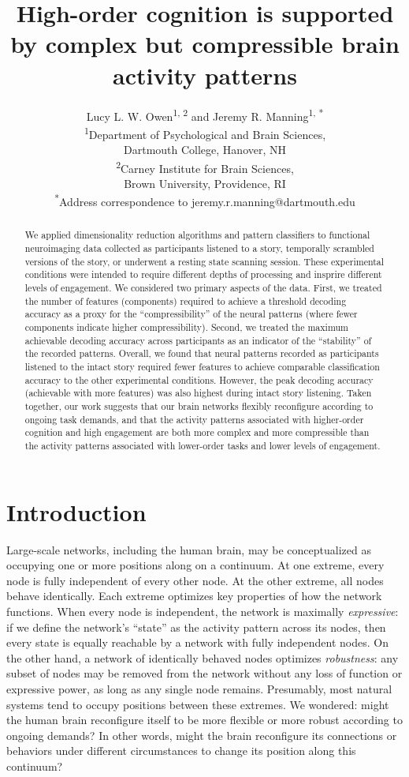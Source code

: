 \documentclass[english]{article}
\title{High-order cognition is supported by complex but compressible brain activity patterns}
\author{Lucy L. W. Owen\textsuperscript{1, 2} and Jeremy R. Manning\textsuperscript{1,
*}\\\textsuperscript{1}Department of Psychological and Brain Sciences,\\Dartmouth College,
Hanover, NH\\[0.1cm]\textsuperscript{2}Carney Institute for Brain Sciences,\\Brown University,
Providence, RI\\[0.1cm] \textsuperscript{*}Address correspondence to
jeremy.r.manning@dartmouth.edu}
\begin{document}
\maketitle


\begin{abstract} 

We applied dimensionality reduction algorithms and pattern classifiers to
functional neuroimaging data collected as participants listened to a story,
temporally scrambled versions of the story, or underwent a resting state
scanning session. These experimental conditions were intended to require
different depths of processing and insprire different levels of engagement. We
considered two primary aspects of the data. First, we treated the number of
features (components) required to achieve a threshold decoding accuracy as a
proxy for the ``compressibility'' of the neural patterns (where fewer
components indicate higher compressibility). Second, we treated the maximum
achievable decoding accuracy across participants as an indicator of the
``stability'' of the recorded patterns. Overall, we found that neural patterns
recorded as participants listened to the intact story required fewer features
to achieve comparable classification accuracy to the other experimental
conditions. However, the peak decoding accuracy (achievable with more features)
was also highest during intact story listening. Taken together, our work
suggests that our brain networks flexibly reconfigure according to ongoing task
demands, and that the activity patterns associated with higher-order cognition
and high engagement are both more complex and more compressible than the
activity patterns associated with lower-order tasks and lower levels of
engagement.

\end{abstract}

\doublespacing

\section*{Introduction}

Large-scale networks, including the human brain, may be conceptualized as
occupying one or more positions along on a continuum. At one extreme, every
node is fully independent of every other node. At the other extreme, all nodes
behave identically. Each extreme optimizes key properties of how the network
functions. When every node is independent, the network is maximally
\textit{expressive}: if we define the network's ``state'' as the activity
pattern across its nodes, then every state is equally reachable by a network
with fully independent nodes. On the other hand, a network of identically
behaved nodes optimizes \textit{robustness}: any subset of nodes may be removed
from the network without any loss of function or expressive power, as long as
any single node remains. Presumably, most natural systems tend to occupy
positions between these extremes. We wondered: might the human brain
reconfigure itself to be more flexible or more robust according to ongoing
demands? In other words, might the brain reconfigure its connections or
behaviors under different circumstances to change its position along this
continuum?
\end{document}
